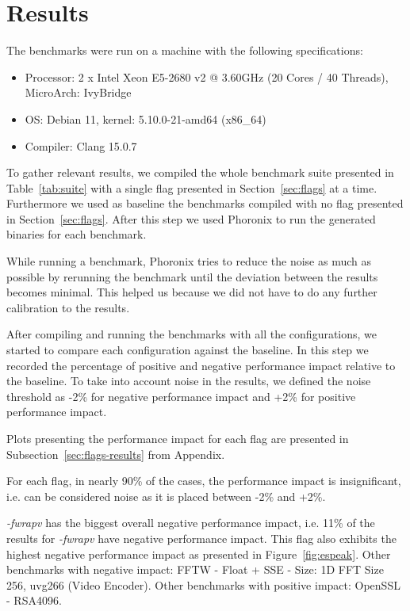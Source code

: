 \section{Results} \label{sec:results}

The benchmarks were run on a machine with the following specifications:
\begin{itemize}
\item Processor: 2 x Intel Xeon E5-2680 v2 @ 3.60GHz (20 Cores / 40 Threads),
MicroArch: IvyBridge
\item OS: Debian 11, kernel: 5.10.0-21-amd64 (x86\_64)
\item Compiler: Clang 15.0.7
\end{itemize}

To gather relevant results, we compiled the whole benchmark suite presented in
Table~\ref{tab:suite} with a single flag presented in Section~\ref{sec:flags} at
a time. Furthermore we used as baseline the benchmarks compiled with no flag
presented in Section~\ref{sec:flags}. After this step we used Phoronix to run
the generated binaries for each benchmark.

While running a benchmark, Phoronix tries to reduce the noise as much as
possible by rerunning the benchmark until the deviation between the results
becomes minimal. This helped us because we did not have to do any further
calibration to the results.

After compiling and running the benchmarks with all the configurations, we
started to compare each configuration against the baseline. In this step we
recorded the percentage of positive and negative performance impact relative to
the baseline. To take into account noise in the results, we defined the noise
threshold as -2\% for negative performance impact and +2\% for positive
performance impact.

Plots presenting the performance impact for each flag are presented in
Subsection~\ref{sec:flags-results} from Appendix.

For each flag, in nearly 90\% of the cases, the performance impact is
insignificant, i.e. can be considered noise as it is placed between -2\% and
+2\%. 

\textit{-fwrapv} has the biggest overall negative performance impact, i.e. 11\%
of the results for \textit{-fwrapv} have negative performance impact. This flag
also exhibits the highest negative performance impact as presented in
Figure~\ref{fig:espeak}. Other benchmarks with negative impact: FFTW - Float +
SSE - Size: 1D FFT Size 256, uvg266 (Video Encoder). Other benchmarks with
positive impact: OpenSSL - RSA4096.

